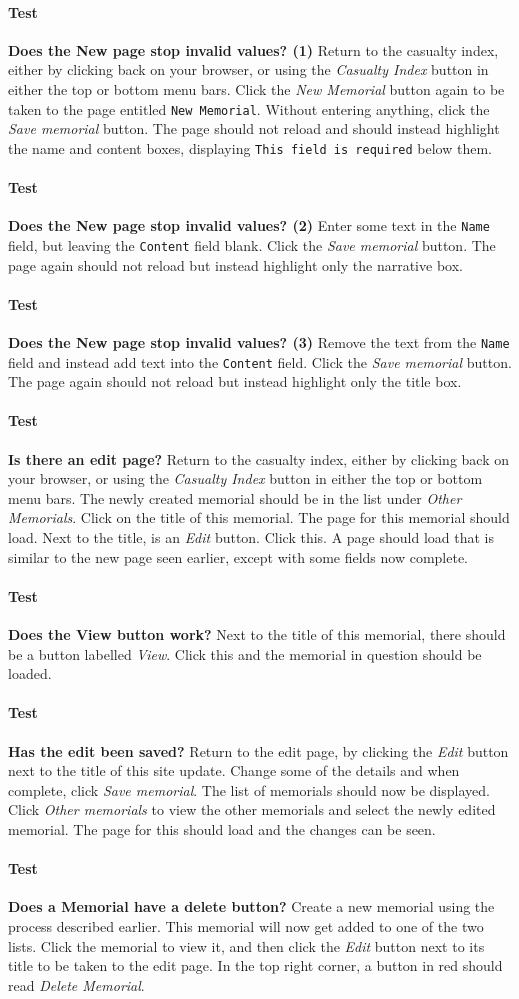 \documentclass[12pt]{article}
\newcounter{Test}
\newcommand{\test}[1]{%
\stepcounter{Test}%
\paragraph{Test \theTest} \textbf{#1} }
\begin{document}
\test{Does the New page stop invalid values? (1)}
Return to the casualty index, either by clicking back on your browser, or using the \textit{Casualty Index} button in either the top or bottom menu bars. Click the \textit{New Memorial} button again to be taken to the page entitled \texttt{New Memorial}. Without entering anything, click the \textit{Save memorial} button. The page should not reload and should instead highlight the name and content boxes, displaying \texttt{This field is required} below them.

\test{Does the New page stop invalid values? (2)}
Enter some text in the \texttt{Name} field, but leaving the \texttt{Content} field blank. Click the \textit{Save memorial} button. The page again should not reload but instead highlight only the narrative box.

\test{Does the New page stop invalid values? (3)}
Remove the text from the \texttt{Name} field and instead add text into the \texttt{Content} field. Click the \textit{Save memorial} button. The page again should not reload but instead highlight only the title box.

\test{Is there an edit page?}
Return to the casualty index, either by clicking back on your browser, or using the \textit{Casualty Index} button in either the top or bottom menu bars. The newly created memorial should be in the list under \textit{Other Memorials}. Click on the title of this memorial. The page for this memorial should load. Next to the title, is an \textit{Edit} button. Click this. A page should load that is similar to the new page seen earlier, except with some fields now complete.

\test{Does the View button work?}
Next to the title of this memorial, there should be a button labelled \textit{View}. Click this and the memorial in question should be loaded.

\test{Has the edit been saved?}
Return to the edit page, by clicking the \textit{Edit} button next to the title of this site update. Change some of the details and when complete, click \textit{Save memorial}. The list of memorials should now be displayed. Click \textit{Other memorials} to view the other memorials and select the newly edited memorial. The page for this should load and the changes can be seen.

\test{Does a Memorial have a delete button?}
Create a new memorial using the process described earlier. This memorial will now get added to one of the two lists. Click the memorial to view it, and then click the \textit{Edit} button next to its title to be taken to the edit page. In the top right corner, a button in red should read \textit{Delete Memorial}.
\end{document}
